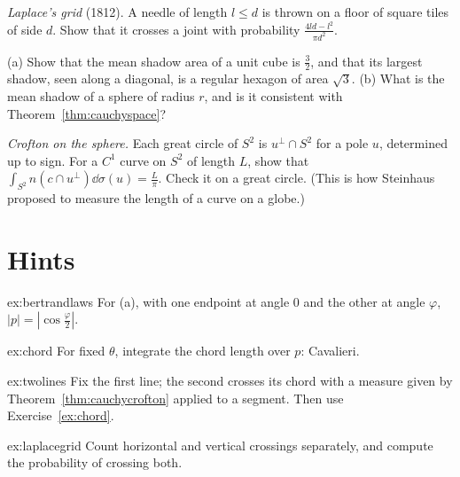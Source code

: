 \begin{exercise}[$\star\star$]\label{ex:laplacegrid}
\emph{Laplace's grid} (1812). A needle of length $l\le d$ is thrown on a floor of square tiles of side $d$. Show that it crosses a joint with probability $\frac{4ld-l^2}{\pi d^2}$.
\end{exercise}

\begin{exercise}[$\star$]\label{ex:shadows}
(a) Show that the mean shadow area of a unit cube is $\frac32$, and that its largest shadow, seen along a diagonal, is a regular hexagon of area $\sqrt3$. (b) What is the mean shadow of a sphere
of radius $r$, and is it consistent with Theorem~\ref{thm:cauchyspace}?
\end{exercise}

\begin{exercise}[$\star\star$]\label{ex:spherecrofton}
\emph{Crofton on the sphere.} Each great circle of $S^2$ is $u^\perp\cap S^2$ for a pole $u$, determined up to sign. For a $C^1$ curve on $S^2$ of length $L$, show that
$\int_{S^2}n(c\cap u^\perp)\dd\sigma(u)=\frac L\pi$. Check it on a great circle. (This is how Steinhaus proposed to measure the length of a curve on a globe.)
\end{exercise}

\section{Hints}

\begin{hint}{ex:bertrandlaws}
For (a), with one endpoint at angle $0$ and the other at angle $\varphi$, $|p|=|\cos\frac\varphi2|$.
\end{hint}

\begin{hint}{ex:chord}
For fixed $\theta$, integrate the chord length over $p$: Cavalieri.
\end{hint}

\begin{hint}{ex:twolines}
Fix the first line; the second crosses its chord with a measure given by Theorem~\ref{thm:cauchycrofton} applied to a segment. Then use Exercise~\ref{ex:chord}.
\end{hint}

\begin{hint}{ex:laplacegrid}
Count horizontal and vertical crossings separately, and compute the probability of crossing both.
\end{hint}

